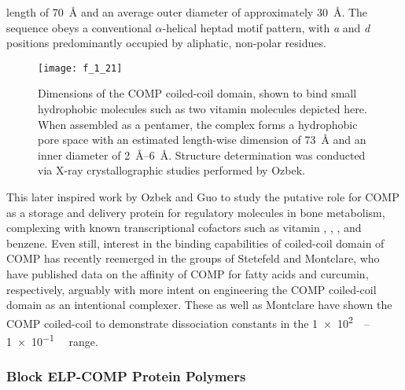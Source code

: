 \begin{refsection}
length of \SI{70}{\angstrom} and an average outer diameter of approximately
\SI{30}{\angstrom}. The sequence obeys a conventional ${\alpha}$-helical heptad
motif pattern, with \emph{a} and \emph{d} positions predominantly occupied by
aliphatic, non-polar residues.\cite{Burkhard2001} 
\begin{figure}[h!] \centering \texttt{[image: f\_1\_21]}
    \caption[Dimensions of the COMP coiled-coil domain, shown to bind small
        hydrophobic molecules such as two vitamin  molecules depicted
        here. When assembled as a pentamer, the complex forms a hydrophobic pore
        space with an estimated length-wise dimension of \SI{73}{\angstrom} and
    an inner diameter of \SIrange{2}{6}{\angstrom}. Structure determination was
conducted via X-ray crystallographic studies performed by Ozbek.]{Dimensions of
    the COMP coiled-coil domain, shown to bind small hydrophobic molecules such
    as two vitamin  molecules depicted here. When assembled as a
    pentamer, the complex forms a hydrophobic pore space with an estimated
    length-wise dimension of \SI{73}{\angstrom} and an inner diameter of
    \SIrange{2}{6}{\angstrom}. Structure determination was conducted via X-ray
    crystallographic studies performed by
    Ozbek.\cite{Ozbek2002}}\label{fig:comp_dimensions}
\end{figure}
This later inspired work by Ozbek and Guo to study the putative role for COMP as
a storage and delivery protein for regulatory molecules in bone metabolism,
complexing with known transcriptional cofactors such as vitamin ,
, , and
benzene.\cite{Guo1998,Ozbek2002} Even still, interest in the binding
capabilities of coiled-coil domain of COMP has recently reemerged in the groups
of Stetefeld and Montclare, who have published data on the affinity of COMP for
fatty acids and curcumin, respectively, arguably with more intent on engineering
the COMP coiled-coil domain as an intentional
complexer.\cite{McFarlane2012,Gunasekar2009} These as well as Montclare
have shown the COMP coiled-coil to demonstrate dissociation constants in
the
\SIrange[scientific-notation=true,retain-unity-mantissa=false]{1e2}{1e-1}{\micro\moLar}
range.\cite{Haghpanah2010,Guo1998}

\subsubsection{Block ELP-COMP Protein Polymers}


\end{refsection}
